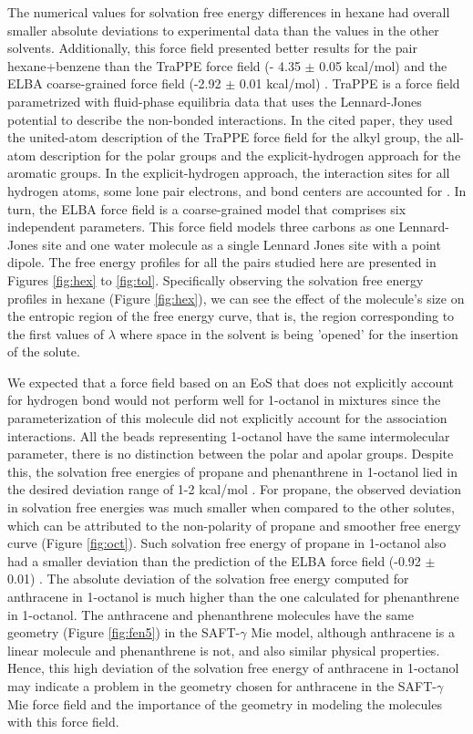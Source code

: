 The numerical values for solvation free energy differences in hexane had overall smaller absolute deviations to experimental data than the values in the other solvents. Additionally, this force field presented better results for the pair hexane+benzene than the TraPPE force field (- 4.35  $\pm$ 0.05 kcal/mol) \cite{garrido2011} and the ELBA coarse-grained force field  (-2.92 $\pm$ 0.01 kcal/mol) \cite{doi:10.1021/acs.jctc.5b00963}. TraPPE is a force field parametrized with fluid-phase equilibria data that uses the Lennard-Jones potential to describe the non-bonded interactions. In the cited paper, they used the united-atom description of the TraPPE force field for the alkyl group, the all-atom description for the polar groups and the explicit-hydrogen approach for the aromatic groups. In the explicit-hydrogen approach, the interaction sites for all hydrogen atoms, some lone pair electrons, and bond centers are accounted for \cite{doi:10.1021/jp073586l}. In turn, the ELBA force field is a coarse-grained model that comprises six independent parameters. This force field models three carbons as one Lennard-Jones site and one water molecule as a single Lennard Jones site with a point dipole. The free energy profiles for all the pairs studied here are presented in Figures \ref{fig:hex} to \ref{fig:tol}. Specifically observing the solvation free energy profiles in hexane (Figure \ref{fig:hex}), we can see the effect of the molecule's size on the entropic region of the free energy curve, that is, the region corresponding to the first values of $\lambda$ where space in the solvent is being 'opened' for the insertion of the solute.

We expected that a force field based on an EoS that does not explicitly account for hydrogen bond would not perform well for 1-octanol in mixtures since the parameterization of this molecule did not explicitly account for the association interactions. All the beads representing 1-octanol have the same intermolecular parameter, there is no distinction between the polar and apolar groups. Despite this, the solvation free energies of propane and phenanthrene in 1-octanol lied in the desired deviation range of 1-2 kcal/mol \cite{doimobley}. For propane, the observed deviation in solvation free energies was much smaller when compared to the other solutes, which can be attributed to the non-polarity of propane and smoother free energy curve (Figure \ref{fig:oct}). Such solvation free energy of propane in 1-octanol also had a smaller deviation than the prediction of the ELBA force field (-0.92 $\pm$ 0.01) \cite{doi:10.1021/acs.jctc.5b00963}. The absolute deviation of the solvation free energy computed for anthracene in 1-octanol is much higher than the one calculated for phenanthrene in 1-octanol. The anthracene and phenanthrene molecules have the same geometry (Figure \ref{fig:fen5}) in the SAFT-$\gamma$ Mie model, although anthracene is a linear molecule and phenanthrene is not, and also similar physical properties. Hence, this high deviation of the solvation free energy of anthracene in 1-octanol may indicate a problem in the geometry chosen for anthracene in the SAFT-$\gamma$ Mie force field and the importance of the geometry in modeling the molecules with this force field.      


